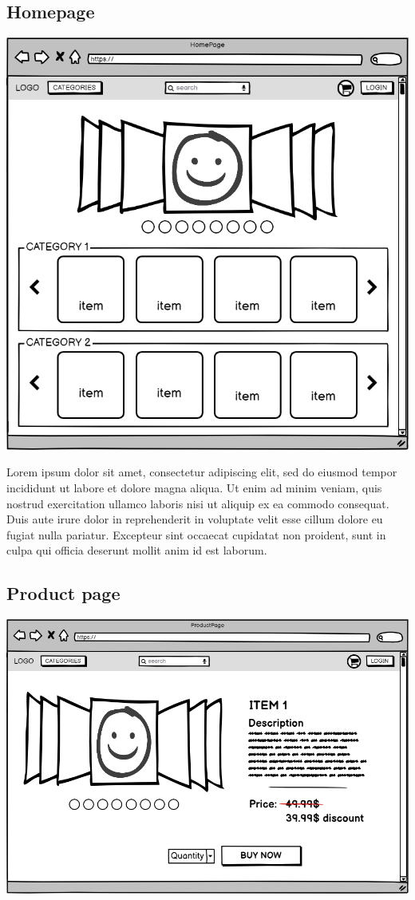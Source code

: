 \subsection{Homepage}
    \includegraphics[width=\textwidth,height=\textheight,keepaspectratio]{mockups/homepageMockup.png}

    Lorem ipsum dolor sit amet, consectetur adipiscing elit, sed do eiusmod tempor incididunt ut labore et dolore magna aliqua. Ut enim ad minim veniam, quis nostrud exercitation ullamco laboris nisi ut aliquip ex ea commodo consequat. Duis aute irure dolor in reprehenderit in voluptate velit esse cillum dolore eu fugiat nulla pariatur. Excepteur sint occaecat cupidatat non proident, sunt in culpa qui officia deserunt mollit anim id est laborum.


\subsection{Product page}
    \includegraphics[width=\textwidth,height=\textheight,keepaspectratio]{mockups/productPageMockup.png}

